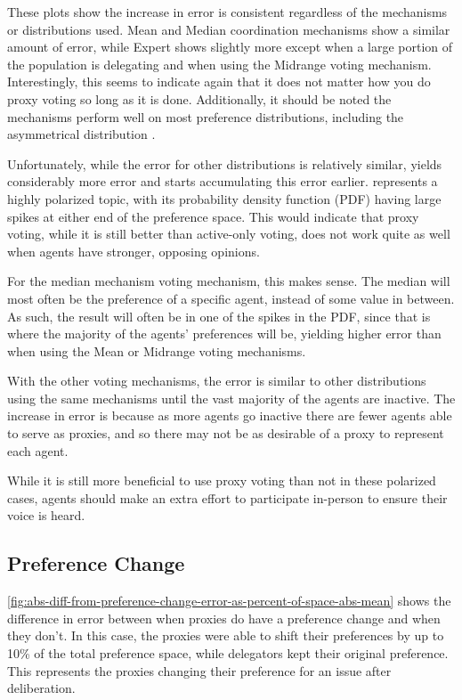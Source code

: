 These plots show the increase in error is consistent regardless of the mechanisms or
distributions used.
Mean and Median coordination mechanisms show a similar amount of error, while Expert
shows slightly more except when a large portion of the population is delegating and
when using the Midrange voting mechanism.
Interestingly, this seems to indicate again that it does not matter how you do proxy
voting so long as it is done.
Additionally, it should be noted the mechanisms perform well on most preference
distributions, including the asymmetrical distribution .

Unfortunately, while the error for other distributions is relatively similar,
 yields considerably more error and starts accumulating
this error earlier.
 represents a highly polarized topic, with its probability
density function (PDF) having large spikes at either end of the preference space.
This would indicate that proxy voting, while it is still better than active-only
voting, does not work quite as well when agents have stronger, opposing opinions.

For the median mechanism voting mechanism, this makes sense.
The median will most often be the preference of a specific agent, instead of some
value in between.
As such, the result will often be in one of the spikes in the PDF, since that is
where the majority of the agents' preferences will be, yielding higher error than when
using the Mean or Midrange voting mechanisms.

With the other voting mechanisms, the error is similar to other distributions using
the same mechanisms until the vast majority of the agents are inactive.
The increase in error is because as more agents go inactive there are fewer agents able
to serve as proxies, and so there may not be as desirable of a proxy to represent
each agent.

While it is still more beneficial to use proxy voting than not in these polarized
cases, agents should make an extra effort to participate in-person to ensure their
voice is heard.

\subsection{Preference Change}\label{subsec:results-shift}
\autoref{fig:abs-diff-from-preference-change-error-as-percent-of-space-abs-mean} shows
the difference in error between when proxies do have a preference change and when
they don't.
In this case, the proxies were able to shift their preferences by up to 10\% of the
total preference space, while delegators kept their original preference.
This represents the proxies changing their preference for an issue after deliberation.

